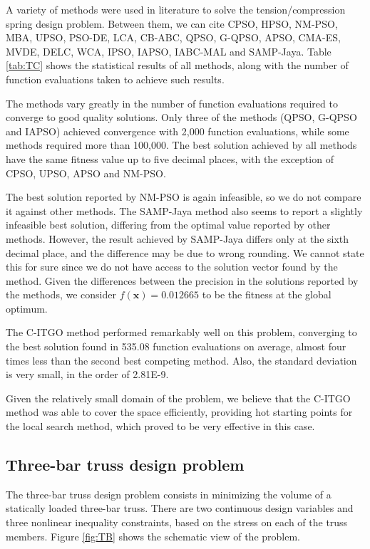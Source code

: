 A variety of methods were used in literature to solve the tension/compression spring design problem. Between them, we can cite CPSO, HPSO, NM-PSO, MBA, UPSO, PSO-DE, LCA, CB-ABC, QPSO, G-QPSO, APSO, CMA-ES, MVDE, DELC, WCA, IPSO, IAPSO, IABC-MAL and SAMP-Jaya. Table \ref{tab:TC} shows the statistical results of all methods, along with the number of function evaluations taken to achieve such results.




The methods vary greatly in the number of function evaluations required to converge to good quality solutions. Only three of the methods (QPSO, G-QPSO and IAPSO) achieved convergence with 2,000 function evaluations, while some methods required more than 100,000. The best solution achieved by all methods have the same fitness value up to five decimal places, with the exception of CPSO, UPSO, APSO and NM-PSO.
 
The best solution reported by NM-PSO is again infeasible, so we do not compare it against other methods. The SAMP-Jaya method also seems to report a slightly infeasible best solution, differing from the optimal value reported by other methods. However, the result achieved by SAMP-Jaya differs only at the sixth decimal place, and the difference may be due to wrong rounding. We cannot state this for sure since we do not have access to the solution vector found by the method. Given the differences between the precision in the solutions reported by the methods, we consider $f(\bm{x}) = 0.012665$ to be the fitness at the global optimum.

The C-ITGO method performed remarkably well on this problem, converging to the best solution found in 535.08 function evaluations on average, almost four times less than the second best competing method. Also, the standard deviation is very small, in the order of 2.81E-9. 

Given the relatively small domain of the problem, we believe that the C-ITGO method was able to cover the space efficiently, providing hot starting points for the local search method, which proved to be very effective in this case.




\subsection{Three-bar truss design problem}

The three-bar truss design problem \citep{TB} consists in minimizing the volume of a statically loaded three-bar truss. There are two continuous design variables and three nonlinear inequality constraints, based on the stress on each of the truss members. Figure \ref{fig:TB} shows the schematic view of the problem.


